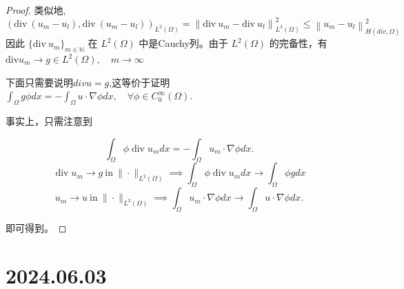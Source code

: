 \documentclass[12pt,a4paper]{article}
\begin{document}
\begin{enumerate}
\begin{proof}
			类似地,
			$$
			(\mathrm{div}\:(u_m-u_l),\mathrm{div}\:(u_m-u_l))_{L^2(\Omega)}=\left\|\mathrm{div}\:u_m-\mathrm{div}\:u_l\right\|_{L^2(\Omega)}^2\leq\left\|u_m-u_l\right\|_{H(div,\Omega)}^2
			$$
			因此 $\{\mathrm{div} \:u_m\}_{m\in\mathbb{N}}$ 在 $L^2(\Omega)$ 中是Cauchy列。由于 $L^2(\Omega)$ 的完备性，有$\mathrm{div} u_m\to g\in L^2(\Omega), \quad m\to\infty$
			
			下面只需要说明$div u = g$,这等价于证明$\int_\Omega g\phi dx=-\int_\Omega u\cdot\nabla\phi dx,\quad \forall \phi\in C_0^\infty(\Omega).$
			
			事实上，只需注意到
			
			$$\int_{\Omega}\phi\operatorname{div}u_{m} dx=-\int_{\Omega}u_{m}\cdot\nabla\phi dx.$$
			$$\operatorname{div}u_{m}\to g\mathrm{~in~}\|\cdot\|_{L^{2}(\Omega)}\implies\int_{\Omega}\phi\operatorname{div}u_{m} dx\to\int_{\Omega}\phi g dx$$
			$$u_{m}\to u\mathrm{~in~}\|\cdot\|_{L^{2}(\Omega)}\implies\int_{\Omega}u_{m}\cdot\nabla\phi dx\to\int_{\Omega}u\cdot\nabla\phi dx.$$
			
			即可得到。
		\end{proof}
		
		
	\end{enumerate}
	
	\newpage
	
	\section*{2024.06.03}	
	
\end{document}
